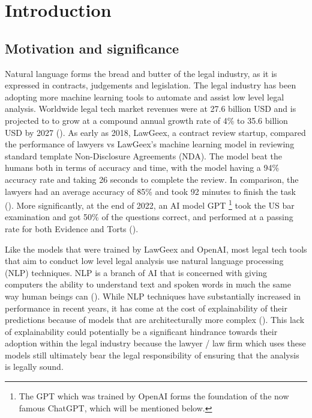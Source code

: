 
\chapter{Introduction} %

\label{chapter1} %

\section{Motivation and significance}
Natural language forms the bread and butter of the legal industry, as it is expressed in contracts, judgements and legislation. The legal industry has been adopting more machine learning tools to automate and assist low level legal analysis. Worldwide legal tech market revenues were at 27.6 billion USD and is projected to to grow at a compound annual growth rate of 4\% to 35.6 billion USD by 2027 (\cite{statista}). As early as 2018, LawGeex, a contract review startup, compared the performance of lawyers vs LawGeex's machine learning model in reviewing standard template Non-Disclosure Agreements (NDA). The model beat the humans both in terms of accuracy and time, with the model having a 94\% accuracy rate and taking 26 seconds to complete the review. In comparison, the lawyers had an average accuracy of 85\% and took 92 minutes to finish the task (\cite{lawgeex}). More significantly, at the end of 2022, an AI model GPT \footnote{The GPT which was trained by OpenAI forms the foundation of the now famous ChatGPT, which will be mentioned below.} took the US bar examination and got 50\% of the questions correct, and performed at a passing rate for both Evidence and Torts (\cite{bommarito2022}).

Like the models that were trained by LawGeex and OpenAI, most legal tech tools that aim to conduct low level legal analysis use natural language processing (NLP) techniques. NLP is a branch of AI that is concerned with giving computers the ability to understand text and spoken words in much the same way human beings can (\cite{ibm_nlp}). While NLP techniques have substantially increased in performance in recent years, it has come at the cost of explainability of their predictions because of models that are architecturally more complex (\cite{zini2022}). This lack of explainability could potentially be a significant hindrance towards their adoption within the legal industry because the lawyer / law firm which uses these models still ultimately bear the legal responsibility of ensuring that the analysis is legally sound.

